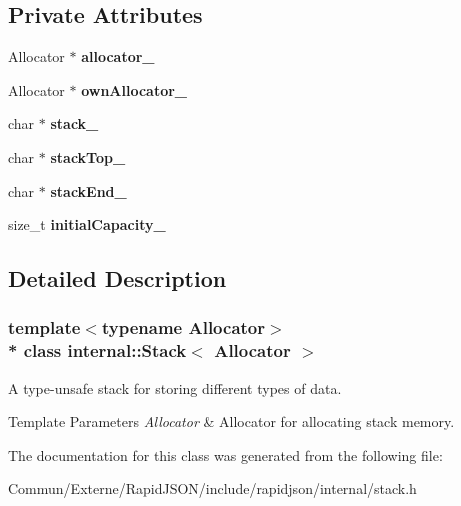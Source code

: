 \subsection*{Private Attributes}
\begin{DoxyCompactItemize}
\item 
Allocator $\ast$ {\bfseries allocator\+\_\+}\hypertarget{classinternal_1_1_stack_a029e18096d082b1c81d7e1075a15eaad}{}\label{classinternal_1_1_stack_a029e18096d082b1c81d7e1075a15eaad}

\item 
Allocator $\ast$ {\bfseries own\+Allocator\+\_\+}\hypertarget{classinternal_1_1_stack_a71e95d02ac850a97e1ee3628a207cbe9}{}\label{classinternal_1_1_stack_a71e95d02ac850a97e1ee3628a207cbe9}

\item 
char $\ast$ {\bfseries stack\+\_\+}\hypertarget{classinternal_1_1_stack_ae2601d824b6b2f17eadd6739eec5c942}{}\label{classinternal_1_1_stack_ae2601d824b6b2f17eadd6739eec5c942}

\item 
char $\ast$ {\bfseries stack\+Top\+\_\+}\hypertarget{classinternal_1_1_stack_aad0ee46c4a6180e2f3e0d9f4348c31f2}{}\label{classinternal_1_1_stack_aad0ee46c4a6180e2f3e0d9f4348c31f2}

\item 
char $\ast$ {\bfseries stack\+End\+\_\+}\hypertarget{classinternal_1_1_stack_af21b647d9f73246e9c96fa0966bdaf5d}{}\label{classinternal_1_1_stack_af21b647d9f73246e9c96fa0966bdaf5d}

\item 
size\+\_\+t {\bfseries initial\+Capacity\+\_\+}\hypertarget{classinternal_1_1_stack_a224b9fa2406bc1c411068fa36c67c90f}{}\label{classinternal_1_1_stack_a224b9fa2406bc1c411068fa36c67c90f}

\end{DoxyCompactItemize}


\subsection{Detailed Description}
\subsubsection*{template$<$typename Allocator$>$\\*
class internal\+::\+Stack$<$ Allocator $>$}

A type-\/unsafe stack for storing different types of data. 


\begin{DoxyTemplParams}{Template Parameters}
{\em Allocator} & Allocator for allocating stack memory. \\
\hline
\end{DoxyTemplParams}


The documentation for this class was generated from the following file\+:\begin{DoxyCompactItemize}
\item 
Commun/\+Externe/\+Rapid\+J\+S\+O\+N/include/rapidjson/internal/stack.\+h\end{DoxyCompactItemize}
